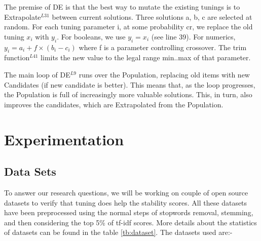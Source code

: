 \documentclass[conference]{IEEEtran}
\theoremstyle{break}
\begin{document}
The premise of DE is that the best way to mutate the existing tunings is to Extrapolate$^{L31}$ between current solutions. Three solutions a, b, c are selected at random. For each tuning parameter i, at some probability cr, we replace the old tuning $x_i$ with $y_i$. For booleans, we use $y_i = x_i$ (see line 39). For numerics, $y_i = a_i + f \times (b_i - c_i)$ where f is a parameter controlling crossover. The trim function$^{L41}$ limits the new value to the legal range min..max of that parameter.

The main loop of DE$^{L9}$ runs over the Population, replacing old items with new Candidates (if new candidate is better). This means that, as the loop progresses, the Population is full of increasingly more valuable solutions. This, in turn, also improves the candidates, which are Extrapolated from the Population.

\section{Experimentation}

\subsection{Data Sets}
To answer our research questions, we will be working on couple of open source datasets to verify that tuning does help the stability scores. All these datasets have been preprocessed using the normal steps of stopwords removal, stemming, and then considering the top 5\% of tf-idf scores. More details about the statistics of datasets can be found in the table \ref{tb:dataset}. The datasets used are:-
\end{document}
